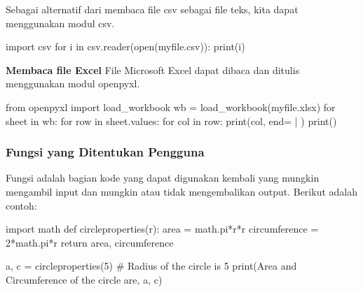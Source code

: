 \documentclass[
  letterpaper,
  DIV=11,
  numbers=noendperiod]{scrreprt}
\newenvironment{Shaded}{\begin{snugshade}}{\end{snugshade}}
\newcommand{\BuiltInTok}[1]{\textcolor[rgb]{0.00,0.23,0.31}{#1}}
\newcommand{\CommentTok}[1]{\textcolor[rgb]{0.37,0.37,0.37}{#1}}
\newcommand{\ControlFlowTok}[1]{\textcolor[rgb]{0.00,0.23,0.31}{#1}}
\newcommand{\DecValTok}[1]{\textcolor[rgb]{0.68,0.00,0.00}{#1}}
\newcommand{\ImportTok}[1]{\textcolor[rgb]{0.00,0.46,0.62}{#1}}
\newcommand{\KeywordTok}[1]{\textcolor[rgb]{0.00,0.23,0.31}{#1}}
\newcommand{\NormalTok}[1]{\textcolor[rgb]{0.00,0.23,0.31}{#1}}
\newcommand{\OperatorTok}[1]{\textcolor[rgb]{0.37,0.37,0.37}{#1}}
\newcommand{\StringTok}[1]{\textcolor[rgb]{0.13,0.47,0.30}{#1}}
\begin{document}
Sebagai alternatif dari membaca file csv sebagai file teks, kita dapat
menggunakan modul csv.

\begin{Shaded}
\begin{Highlighting}[]
\ImportTok{import}\NormalTok{ csv}
\ControlFlowTok{for}\NormalTok{ i }\KeywordTok{in}\NormalTok{ csv.reader(}\BuiltInTok{open}\NormalTok{(}\StringTok{\textquotesingle{}myfile.csv\textquotesingle{}}\NormalTok{)):}
    \BuiltInTok{print}\NormalTok{(i)}
\end{Highlighting}
\end{Shaded}

\textbf{Membaca file Excel} File Microsoft Excel dapat dibaca dan
ditulis menggunakan modul openpyxl.

\begin{Shaded}
\begin{Highlighting}[]
\ImportTok{from}\NormalTok{ openpyxl }\ImportTok{import}\NormalTok{ load\_workbook }
\NormalTok{wb }\OperatorTok{=}\NormalTok{ load\_workbook(}\StringTok{\textquotesingle{}myfile.xlsx\textquotesingle{}}\NormalTok{) }
\ControlFlowTok{for}\NormalTok{ sheet }\KeywordTok{in}\NormalTok{ wb:}
    \ControlFlowTok{for}\NormalTok{ row }\KeywordTok{in}\NormalTok{ sheet.values:}
        \ControlFlowTok{for}\NormalTok{ col }\KeywordTok{in}\NormalTok{ row:}
            \BuiltInTok{print}\NormalTok{(col, end}\OperatorTok{=}\StringTok{\textquotesingle{} | \textquotesingle{}}\NormalTok{) }
        \BuiltInTok{print}\NormalTok{()}
\end{Highlighting}
\end{Shaded}

\hypertarget{fungsi-yang-ditentukan-pengguna}{%
\subsubsection*{Fungsi yang Ditentukan
Pengguna}\label{fungsi-yang-ditentukan-pengguna}}

Fungsi adalah bagian kode yang dapat digunakan kembali yang mungkin
mengambil input dan mungkin atau tidak mengembalikan output. Berikut
adalah contoh:

\begin{Shaded}
\begin{Highlighting}[]
\ImportTok{import}\NormalTok{ math}
\KeywordTok{def}\NormalTok{ circleproperties(r):}
\NormalTok{    area }\OperatorTok{=}\NormalTok{ math.pi}\OperatorTok{*}\NormalTok{r}\OperatorTok{*}\NormalTok{r}
\NormalTok{    circumference }\OperatorTok{=} \DecValTok{2}\OperatorTok{*}\NormalTok{math.pi}\OperatorTok{*}\NormalTok{r}
    \ControlFlowTok{return}\NormalTok{ area, circumference}

\NormalTok{a, c }\OperatorTok{=}\NormalTok{ circleproperties(}\DecValTok{5}\NormalTok{) }\CommentTok{\# Radius of the circle is 5 }
\BuiltInTok{print}\NormalTok{(}\StringTok{\textquotesingle{}Area and Circumference of the circle are\textquotesingle{}}\NormalTok{, a, c)}
\end{Highlighting}
\end{Shaded}
\end{document}

